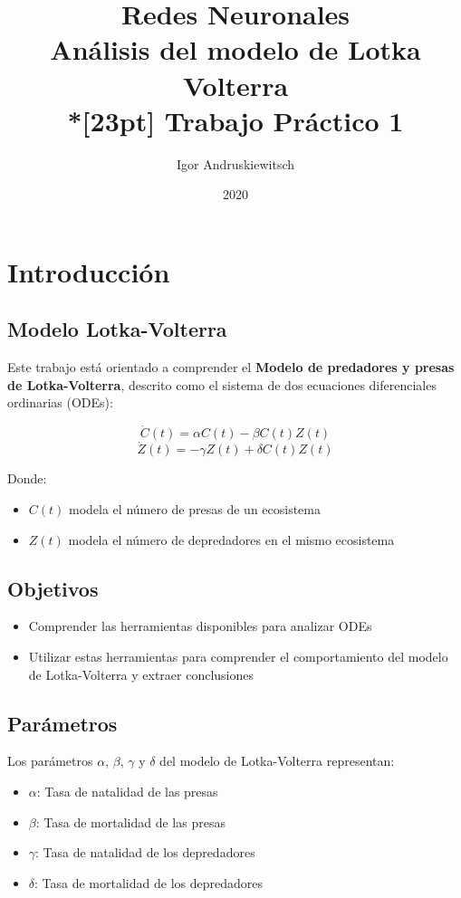 \documentclass [a4paper,12pt,oneside,final]{article}
\title{%
Redes Neuronales \\
Análisis del modelo de Lotka Volterra \\*[23pt]
Trabajo Práctico 1 \\
}
\date{2020}
\author{Igor Andruskiewitsch}
\begin{document}
    \maketitle

\section{Introducción}

\subsection{Modelo Lotka-Volterra}

Este trabajo está orientado a comprender el {\bf Modelo de predadores y presas de Lotka-Volterra}, descrito como el sistema de dos ecuaciones diferenciales ordinarias (ODEs):

\[ \dot{C}(t) = \alpha C(t) - \beta C(t) Z(t) \]
\[ \dot{Z}(t) = - \gamma Z(t) + \delta C(t) Z(t) \]

Donde:

\begin{itemize}
    \item {$ C(t) $ modela el número de presas de un ecosistema}
    \item {$ Z(t) $ modela el número de depredadores en el mismo ecosistema}
\end{itemize}

\subsection{Objetivos}

\begin{itemize}
    \item {Comprender las herramientas disponibles para analizar ODEs}
    \item {Utilizar estas herramientas para comprender el comportamiento del modelo de Lotka-Volterra y extraer conclusiones}
\end{itemize}

\subsection{Parámetros}

Los parámetros $\alpha$, $\beta$, $\gamma$ y $\delta$ del modelo de Lotka-Volterra representan:

\begin{itemize}
    \item{$\alpha$: Tasa de natalidad de las presas}
    \item{$\beta$: Tasa de mortalidad de las presas}
    \item{$\gamma$: Tasa de natalidad de los depredadores}
    \item{$\delta$: Tasa de mortalidad de los depredadores}
\end{itemize}
\end{document}
